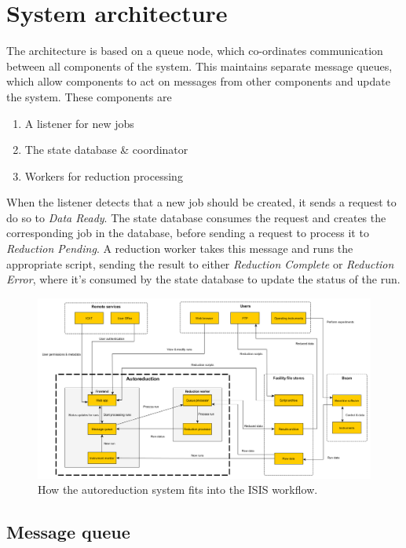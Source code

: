 \documentclass[twocolumn]{article}
\begin{document}
\section{System architecture}\label{system-architecture}

The architecture is based on a queue node, which co-ordinates
communication between all components of the system. This maintains
separate message queues, which allow components to act on messages from
other components and update the system. These components are

\begin{enumerate}
\item
  A listener for new jobs
\item
  The state database \& coordinator
\item
  Workers for reduction processing
\end{enumerate}

When the listener detects that a new job should be created, it sends a
request to do so to \emph{Data Ready}. The state database consumes the
request and creates the corresponding job in the database, before
sending a request to process it to \emph{Reduction Pending}. A reduction
worker takes this message and runs the appropriate script, sending the
result to either \emph{Reduction Complete} or \emph{Reduction Error},
where it's consumed by the state database to update the status of the
run.

\begin{figure}[!htbp]
\includegraphics{system.png}
\caption{How the autoreduction system fits into the ISIS workflow.}
\end{figure}

\subsection{Message queue}\label{message-queue}
\end{document}
